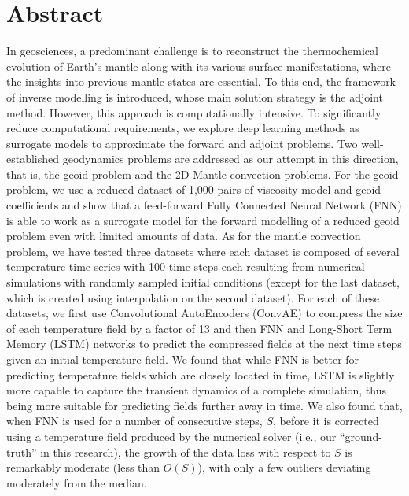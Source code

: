 \chapter*{Abstract}
In geosciences, a predominant challenge is to reconstruct the thermochemical evolution of Earth's mantle along with its various surface manifestations, where the insights into previous mantle states are essential. To this end, 
the framework of inverse modelling is introduced, whose main solution strategy is the adjoint method. However, this approach is computationally intensive. To significantly reduce computational requirements, we explore deep learning methods as surrogate models to approximate the forward and adjoint problems. Two well-established geodynamics problems are addressed as our attempt in this direction, that is, the geoid problem and the 2D Mantle convection problems. For the geoid problem, we use a reduced dataset of 1,000 pairs of viscosity model and geoid coefficients and show that a feed-forward Fully Connected Neural Network (FNN) is able to work as a surrogate model for the forward modelling of a reduced geoid problem even with limited amounts of data. As for the mantle convection problem, we have tested three datasets where each dataset is composed of several temperature time-series with 100 time steps each resulting from numerical simulations with randomly sampled initial conditions (except for the last dataset, which is created using interpolation on the second dataset). For each of these datasets, we first use Convolutional AutoEncoders (ConvAE) to compress the size of each temperature field by a factor of 13 and then FNN and Long-Short Term Memory (LSTM) networks to predict the compressed fields at the next time steps given an initial temperature field. We found that while FNN is better for predicting temperature fields which are closely located in time, LSTM is slightly more capable to capture the transient dynamics of a complete simulation, thus being more suitable for predicting fields further away in time. We also found that, when FNN is used for a number of consecutive steps, $S$, before it is corrected using a temperature field produced by the numerical solver (i.e., our ``ground-truth'' in this research), the growth of the data loss with respect to $S$ is remarkably moderate (less than $O(S)$), with only a few outliers deviating moderately from the median.